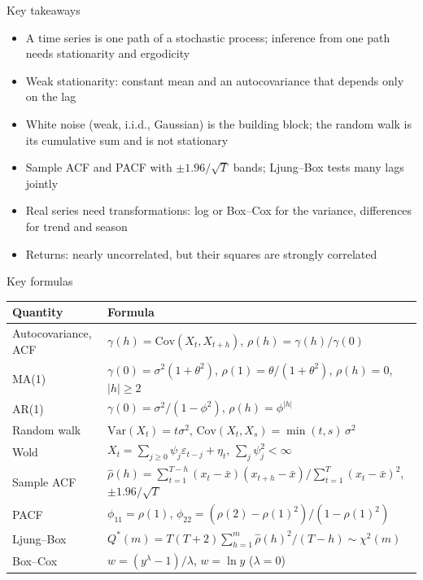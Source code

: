 \begin{frame}{Key takeaways}
\itemsize{\small}
\begin{itemize}
    \item A time series is one path of a stochastic process; inference from one path needs stationarity and ergodicity
    \item Weak stationarity: constant mean and an autocovariance that depends only on the lag
    \item White noise (weak, i.i.d., Gaussian) is the building block; the random walk is its cumulative sum and is not stationary
    \item Sample ACF and PACF with $\pm 1.96/\sqrt{T}$ bands; Ljung--Box tests many lags jointly
    \item Real series need transformations: log or Box--Cox for the variance, differences for trend and season
    \item Returns: nearly uncorrelated, but their squares are strongly correlated
\end{itemize}
\end{frame}

\begin{frame}{Key formulas}
\itemsize{\small}
{\renewcommand{\arraystretch}{1.4}\begin{center}
\scriptsize
\begin{tabular}{ll}
\toprule
\textbf{Quantity} & \textbf{Formula} \\
\midrule
Autocovariance, ACF & $\gamma(h) = \mathrm{Cov}(X_t, X_{t+h})$, \quad $\rho(h) = \gamma(h)/\gamma(0)$ \\
MA(1) & $\gamma(0) = \sigma^2(1 + \theta^2)$, \quad $\rho(1) = \theta/(1 + \theta^2)$, \quad $\rho(h) = 0$, $|h| \ge 2$ \\
AR(1) & $\gamma(0) = \sigma^2/(1 - \phi^2)$, \quad $\rho(h) = \phi^{|h|}$ \\
Random walk & $\mathrm{Var}(X_t) = t\sigma^2$, \quad $\mathrm{Cov}(X_t, X_s) = \min(t, s)\,\sigma^2$ \\
Wold & $X_t = \sum_{j \ge 0}\psi_j\varepsilon_{t-j} + \eta_t$, \quad $\sum_j\psi_j^2 < \infty$ \\
Sample ACF & $\hat\rho(h) = \sum_{t=1}^{T-h}(x_t - \bar x)(x_{t+h} - \bar x)/\sum_{t=1}^{T}(x_t - \bar x)^2$, \quad $\pm 1.96/\sqrt{T}$ \\
PACF & $\phi_{11} = \rho(1)$, \quad $\phi_{22} = (\rho(2) - \rho(1)^2)/(1 - \rho(1)^2)$ \\
Ljung--Box & $Q^*(m) = T(T + 2)\sum_{h=1}^{m}\hat\rho(h)^2/(T - h) \sim \chi^2(m)$ \\
Box--Cox & $w = (y^\lambda - 1)/\lambda$, \quad $w = \ln y$ ($\lambda = 0$) \\
\bottomrule
\end{tabular}
\end{center}
}
\end{frame}

